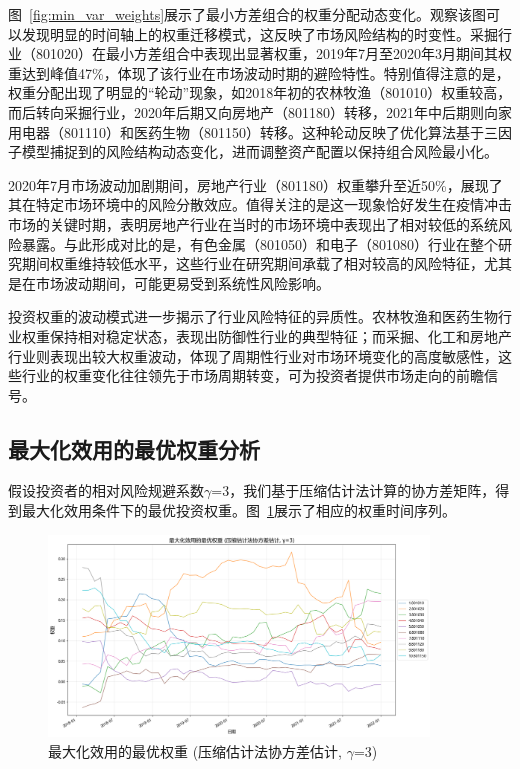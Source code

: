 \documentclass[12pt, a4paper]{article}
\begin{document}
图~\ref{fig:min_var_weights}展示了最小方差组合的权重分配动态变化。观察该图可以发现明显的时间轴上的权重迁移模式，这反映了市场风险结构的时变性。采掘行业（801020）在最小方差组合中表现出显著权重，2019年7月至2020年3月期间其权重达到峰值47\%，体现了该行业在市场波动时期的避险特性。特别值得注意的是，权重分配出现了明显的“轮动”现象，如2018年初的农林牧渔（801010）权重较高，而后转向采掘行业，2020年后期又向房地产（801180）转移，2021年中后期则向家用电器（801110）和医药生物（801150）转移。这种轮动反映了优化算法基于三因子模型捕捉到的风险结构动态变化，进而调整资产配置以保持组合风险最小化。

2020年7月市场波动加剧期间，房地产行业（801180）权重攀升至近50\%，展现了其在特定市场环境中的风险分散效应。值得关注的是这一现象恰好发生在疫情冲击市场的关键时期，表明房地产行业在当时的市场环境中表现出了相对较低的系统风险暴露。与此形成对比的是，有色金属（801050）和电子（801080）行业在整个研究期间权重维持较低水平，这些行业在研究期间承载了相对较高的风险特征，尤其是在市场波动期间，可能更易受到系统性风险影响。

投资权重的波动模式进一步揭示了行业风险特征的异质性。农林牧渔和医药生物行业权重保持相对稳定状态，表现出防御性行业的典型特征；而采掘、化工和房地产行业则表现出较大权重波动，体现了周期性行业对市场环境变化的高度敏感性，这些行业的权重变化往往领先于市场周期转变，可为投资者提供市场走向的前瞻信号。

\subsection{最大化效用的最优权重分析}

假设投资者的相对风险规避系数$\gamma$=3，我们基于压缩估计法计算的协方差矩阵，得到最大化效用条件下的最优投资权重。图~\ref{fig:max_util_weights}展示了相应的权重时间序列。

\begin{figure}[htbp]
\centering
\includegraphics[width=0.9\textwidth]{./img/max_util_weights.png}
\caption{最大化效用的最优权重 (压缩估计法协方差估计, $\gamma$=3)}
\label{fig:max_util_weights}
\end{figure}
\end{document}
